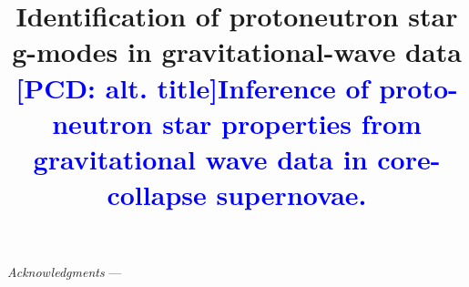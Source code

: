 \documentclass[aps, twocolumn, superscriptaddress, showpacs, nofootinbib, longbibliography]{revtex4-1}
\newcommand{\pcd}[1]{\textcolor{blue}{#1}}
\begin{document}
\linenumbers

\title{Identification of protoneutron star g-modes in gravitational-wave data
\pcd{[PCD: alt. title]Inference of proto-neutron star properties from gravitational wave data in core-collapse supernovae.}}

\begin{abstract}

\end{abstract}

\maketitle

\bigskip

\bigskip

\bigskip

\bigskip

\bigskip


\bigskip\noindent\textit{Acknowledgments} ---

\begin{appendices}

\end{appendices}
%

\end{document}
